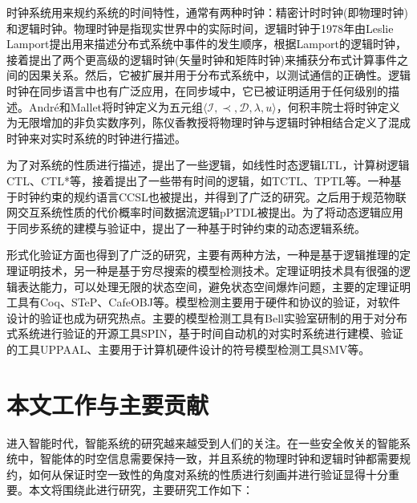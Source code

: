 时钟系统用来规约系统的时间特性，通常有两种时钟：精密计时时钟(即物理时钟)和逻辑时钟。物理时钟是指现实世界中的实际时间，逻辑时钟于1978年由Leslie Lamport提出用来描述分布式系统中事件的发生顺序，根据Lamport的逻辑时钟，接着提出了两个更高级的逻辑时钟(矢量时钟和矩阵时钟)来捕获分布式计算事件之间的因果关系。然后，它被扩展并用于分布式系统中，以测试通信的正确性。逻辑时钟在同步语言中也有广泛应用，在同步域中，它已被证明适用于任何级别的描述。Andr{\'e}和Mallet将时钟定义为五元组$\langle \mathcal{I},\prec,\mathcal{D},\lambda,u\rangle$，何积丰院士将时钟定义为无限增加的非负实数序列，陈仪香教授将物理时钟与逻辑时钟相结合定义了混成时钟来对实时系统的时钟进行描述。

为了对系统的性质进行描述，提出了一些逻辑，如线性时态逻辑LTL，计算树逻辑CTL、CTL*等，接着提出了一些带有时间的逻辑，如TCTL、TPTL等。一种基于时钟约束的规约语言CCSL也被提出，并得到了广泛的研究。之后用于规范物联网交互系统性质的代价概率时间数据流逻辑pPTDL被提出。为了将动态逻辑应用于同步系统的建模与验证中，提出了一种基于时钟约束的动态逻辑系统。

形式化验证方面也得到了广泛的研究，主要有两种方法，一种是基于逻辑推理的定理证明技术，另一种是基于穷尽搜索的模型检测技术。定理证明技术具有很强的逻辑表达能力，可以处理无限的状态空间，避免状态空间爆炸问题，主要的定理证明工具有Coq、STeP、CafeOBJ等。模型检测主要用于硬件和协议的验证，对软件设计的验证也成为研究热点。主要的模型检测工具有Bell实验室研制的用于对分布式系统进行验证的开源工具SPIN，基于时间自动机的对实时系统进行建模、验证的工具UPPAAL、主要用于计算机硬件设计的符号模型检测工具SMV等。

\section{本文工作与主要贡献}
进入智能时代，智能系统的研究越来越受到人们的关注。在一些安全攸关的智能系统中，智能体的时空信息需要保持一致，并且系统的物理时钟和逻辑时钟都需要规约，如何从保证时空一致性的角度对系统的性质进行刻画并进行验证显得十分重要。本文将围绕此进行研究，主要研究工作如下：

